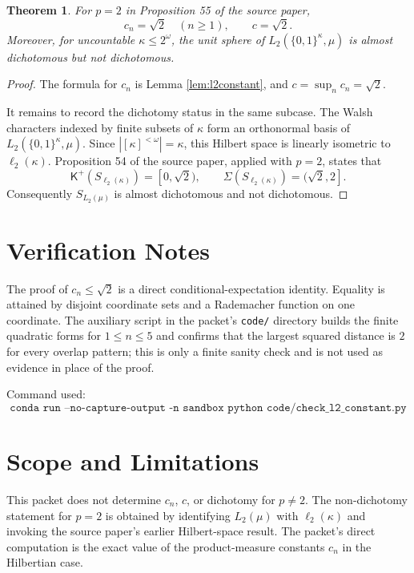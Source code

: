 \documentclass[11pt]{article}
\newtheorem{theorem}{Theorem}
\newcommand{\kappaCard}{\kappa}
\newcommand{\Kplus}{\mathsf K^+}
\newcommand{\SigmaSet}{\Sigma}
\begin{document}
\begin{theorem}\label{thm:l2subcase}
For \(p=2\) in Proposition 55 of the source paper,
\[
 c_n=\sqrt2\quad(n\geq1),\qquad c=\sqrt2.
\]
Moreover, for uncountable \(\kappaCard\leq 2^\omega\), the unit sphere of \(L_2(\{0,1\}^{\kappaCard},\mu)\) is almost dichotomous but not dichotomous.
\end{theorem}

\begin{proof}
The formula for \(c_n\) is Lemma \ref{lem:l2constant}, and \(c=\sup_n c_n=\sqrt2\).

It remains to record the dichotomy status in the same subcase.  The Walsh characters indexed by finite subsets of \(\kappaCard\) form an orthonormal basis of \(L_2(\{0,1\}^{\kappaCard},\mu)\).  Since \(|[\kappaCard]^{<\omega}|=\kappaCard\), this Hilbert space is linearly isometric to \(\ell_2(\kappaCard)\).  Proposition 54 of the source paper, applied with \(p=2\), states that
\[
 \Kplus(S_{\ell_2(\kappaCard)})=[0,\sqrt2),
 \qquad
 \SigmaSet(S_{\ell_2(\kappaCard)})=(\sqrt2,2].
\]
Consequently \(S_{L_2(\mu)}\) is almost dichotomous and not dichotomous.
\end{proof}

\section*{Verification Notes}

The proof of \(c_n\leq\sqrt2\) is a direct conditional-expectation identity.  Equality is attained by disjoint coordinate sets and a Rademacher function on one coordinate.  The auxiliary script in the packet's \texttt{code/} directory builds the finite quadratic forms for \(1\leq n\leq5\) and confirms that the largest squared distance is \(2\) for every overlap pattern; this is only a finite sanity check and is not used as evidence in place of the proof.

Command used:
\[
\texttt{conda run --no-capture-output -n sandbox python code/check\_l2\_constant.py}
\]

\section*{Scope and Limitations}

This packet does not determine \(c_n\), \(c\), or dichotomy for \(p\neq2\).  The non-dichotomy statement for \(p=2\) is obtained by identifying \(L_2(\mu)\) with \(\ell_2(\kappaCard)\) and invoking the source paper's earlier Hilbert-space result.  The packet's direct computation is the exact value of the product-measure constants \(c_n\) in the Hilbertian case.
\end{document}
